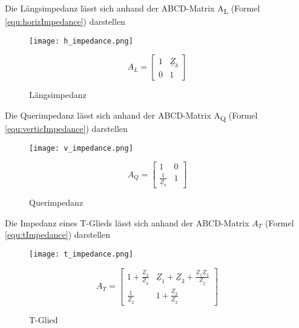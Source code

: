 Die Längsimpedanz lässt sich anhand der ABCD-Matrix A\textsubscript{L} (Formel \ref{equ:horizImpedance}) darstellen
\begin{figure}[H]
	\begin{minipage}[h]{0.45\linewidth}
		\centering
		\texttt{[image: h\_impedance.png]}
		\caption{Längsimpedanz \cite{2torTabelle}}
	\end{minipage}
	\begin{minipage}[h]{0.45\linewidth}
		\centering
		\begin{equation}\label{equ:horizImpedance}
			A_L = \left[\begin{matrix}
			1&\underline{Z}_b\\0&1
			\end{matrix}\right]
		\end{equation}
	\end{minipage}
\end{figure}
Die Querimpedanz lässt sich anhand der ABCD-Matrix A\textsubscript{Q} (Formel \ref{equ:verticImpedance}) darstellen
\begin{figure}[H]
	\begin{minipage}[h]{0.45\linewidth}
		\centering
		\texttt{[image: v\_impedance.png]}
		\caption{Querimpedanz \cite{2torTabelle}}
	\end{minipage}
	\begin{minipage}[h]{0.45\linewidth}
		\centering
		\begin{equation}\label{equ:verticImpedance}
			A_Q = \left[\begin{matrix}
			1&0\\\frac{1}{\underline{Z}_a}&1
			\end{matrix}\right]
		\end{equation}
	\end{minipage}
\end{figure}
Die Impedanz eines T-Glieds lässt sich anhand der ABCD-Matrix $A_T$ (Formel \ref{equ:tImpedance}) darstellen
\begin{figure}[H]
	\begin{minipage}[h]{0.45\linewidth}
		\centering
		\texttt{[image: t\_impedance.png]}\label{fig:tImpedance}
		\caption{T-Glied \cite{2torTabelle}}
	\end{minipage}
	\begin{minipage}[h]{0.45\linewidth}
		\centering
		\begin{equation}\label{equ:tImpedance}
			A_T = \left[\begin{matrix}
			1+\frac{\underline{Z}_2}{\underline{Z}_3}&\underline{Z}_1+\underline{Z}_3+\frac{\underline{Z}_1\underline{Z}_3}{\underline{Z}_2}\\
			\frac{1}{\underline{Z}_2}&1+\frac{\underline{Z}_3}{\underline{Z}_2}
			\end{matrix}\right]
		\end{equation}
	\end{minipage}
\end{figure}
